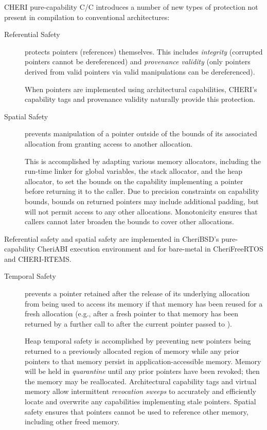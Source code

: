 \documentclass[12pt,twoside,openright,usletter]{article}
\newcommand{\ccode}[1]{{\small\ttfamily{#1}}}
\newcommand{\cfunc}[1]{{\ccode{#1()}}}
\newcommand*{\cpp}[1][]{C\textsmaller[2]{\nolinebreak[4]\hspace{-.05em}\raisebox{.45ex}{\textbf{++}}}}
\newcommand*{\purecapCOrCpp}[1]{CHERI pure-capability C/\cpp{}}
\begin{document}
\purecapCOrCpp{} introduces a number of new types of protection not
present in compilation to conventional architectures:

\begin{description}
\item[Referential Safety] protects pointers (references) themselves.
  This includes \textit{integrity} (corrupted pointers cannot be dereferenced)
  and \textit{provenance validity} (only pointers derived from valid pointers
  via valid manipulations can be dereferenced).

  When pointers are implemented using architectural capabilities, CHERI's
  capability tags and provenance validity naturally provide this protection.

\item[Spatial Safety] prevents manipulation of a pointer outside of the bounds
  of its associated allocation from granting access to another allocation.

  This is accomplished by adapting various memory allocators, including the run-time
  linker for global variables, the stack allocator, and the heap allocator,
  to set the bounds on the capability implementing a pointer before returning
  it to the caller.
  Due to precision constraints on capability bounds, bounds on returned
  pointers may include additional padding, but will not permit access to any
  other allocations.
  Monotonicity ensures that callers cannot later broaden the bounds to cover
  other allocations.
\end{description}

\noindent
Referential safety and spatial safety are implemented in CheriBSD's
pure-capability CheriABI execution environment and for bare-metal in
CheriFreeRTOS and CHERI-RTEMS.

\begin{description}
\item[Temporal Safety] prevents a pointer retained after the release of its
  underlying allocation from being used to access its memory if that memory
  has been reused for a fresh allocation (e.g., after a fresh pointer to that
  memory has been returned by a further call to \cfunc{malloc} after the
  current pointer passed to \cfunc{free}).

  Heap temporal safety is accomplished by preventing new pointers being
  returned to a previously allocated region of memory while any prior pointers
  to that memory persist in application-accessible memory.
  Memory will be held in \textit{quarantine} until any prior pointers have
  been revoked; then the memory may be reallocated.
  Architectural capability tags and virtual memory allow intermittent
  \textit{revocation sweeps} to accurately and efficiently locate and
  overwrite any capabilities implementing stale pointers.
  Spatial safety ensures that pointers cannot be used to reference other
  memory, including other freed memory.
\end{description}
\end{document}
